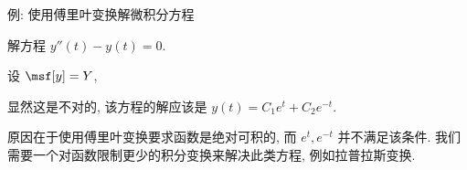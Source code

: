 \begin{frame}{例: 使用傅里叶变换解微积分方程\noexer}
	\onslide<+->
	\begin{example}
		解方程 $y''(t)-y(t)=0$.
	\end{example}

	\onslide<+->
	\begin{solution}
			设 $\msf[y]=Y$,
		\onslide<+->{则
			\[\msf[y''(t)-y(t)]=[(j\omega)^2-1]Y(\omega)=0,\]
		}
		\vspace{-\baselineskip}
		\onslide<+->{\[Y(\omega)=0,\quad y(t)=\msf^{-1}[Y(\omega)]=0.\]}
		\vspace{-\baselineskip}
	\end{solution}

	\onslide<+->
	显然这是不对的, 该方程的解应该是 $y(t)=C_1e^t+C_2e^{-t}$.

	\onslide<+->
	原因在于使用傅里叶变换要求函数是绝对可积的, 而 $e^t,e^{-t}$ 并不满足该条件.
	\onslide<+->
	我们需要一个对函数限制更少的积分变换来解决此类方程, 例如拉普拉斯变换.
\end{frame}

